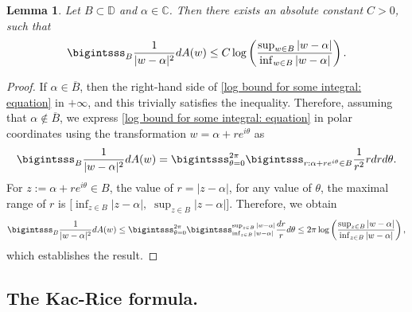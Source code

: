 \documentclass[9pt,a4paper,reqno]{amsart}
\theoremstyle{mine}
\newtheorem{Lemma}[thm]{Lemma}
\theoremstyle{definition}
\theoremstyle{remark}
\newcommand{\mb}{\mathbb}
\begin{document}



\begin{Lemma}\label{log bound for some integral: lemma}
    Let $B \subset \mb{D} $ and $\alpha \in \mb{C}$. Then there exists an absolute constant $C>0$, such that 
\begin{align}\label{log bound for some integral: equation}
        \bigintsss_B \frac{1}{|w-\alpha|^2} dA(w) \leq C  \log \left(\frac{\sup_{w\in B}|w-\alpha|}{\inf_{w \in B}|w-\alpha|}\right).
    \end{align}
\end{Lemma}

\begin{proof}
    If $\alpha  \in \overline{B}$, then the right-hand side of \eqref{log bound for some integral: equation} in $+\infty$, and this trivially satisfies the inequality. Therefore, assuming that $\alpha \notin \overline{B}$, we express 
\eqref{log bound for some integral: equation} in polar coordinates using the transformation 
$w = \alpha + r e^{i\theta}$ as
\begin{align*}
    \bigintsss_B \frac{1}{|w-\alpha|^2} dA(w)= \bigintsss_{\theta =0}^{2\pi}  \bigintsss_{r: \alpha + r e^{i\theta} \in B} \frac{1}{r^2} rdrd\theta.
\end{align*}
For $z:= \alpha + r e^{i\theta} \in B$, the value of $r=|z-\alpha|$, 
 for any value of $\theta$, the maximal range of $r$ is $\big[ \inf_{z \in B} |z - \alpha|, \; \sup_{z \in B} |z - \alpha| \big].$
Therefore, we obtain
    \begin{align*}
          \bigintsss_B \frac{1}{|w-\alpha|^2} dA(w) \leq \bigintsss_{\theta =0}^{2\pi} \bigintsss_{\inf_{z \in B}|w-\alpha|}^{\sup_{z\in B}|w-\alpha|} \frac{dr}{r} d\theta \leq 2 \pi \log \left(\frac{\sup_{z\in B}|w-\alpha|}{\inf_{z \in B}|w-\alpha|}\right),
    \end{align*}
    which establishes the result.
\end{proof}

\subsection{The Kac-Rice formula.}
\end{document}
